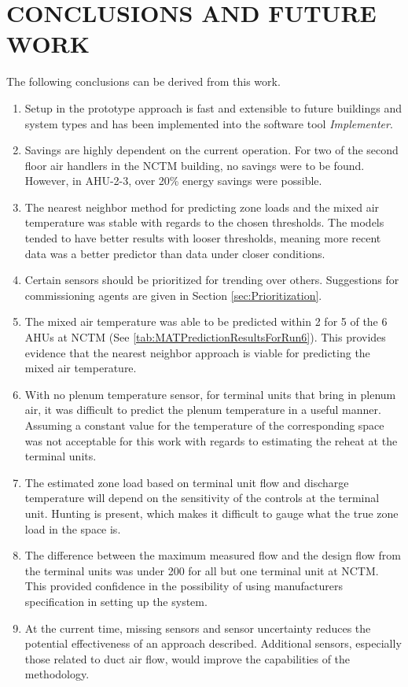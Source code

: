 \chapter{\texorpdfstring{\MakeUppercase{Conclusions and Future Work}}{Conclusions and Future Work}}

The following conclusions can be derived from this work.

\begin{enumerate}
    \item Setup in the prototype approach is fast and extensible to
        future buildings and system types and has been implemented into
        the software tool \textit{Implementer}.
    \item Savings are highly dependent on the current operation. For two
        of the second floor air handlers in the NCTM building, no
        savings were to be found. However, in AHU-2-3, over 20\% energy
        savings were possible.
    \item The nearest neighbor method for predicting zone loads and the
        mixed air temperature was stable with regards to the chosen
        thresholds. The models tended to have better results with looser
        thresholds, meaning more recent data was a better predictor than
        data under closer conditions.
    \item Certain sensors should be prioritized for trending over
        others. Suggestions for commissioning agents are given in
        Section \ref{sec:Prioritization}.
    \item The mixed air temperature was able to be predicted within
        \SI{2}{\degF} for 5 of the 6 AHUs at NCTM (See \tableref{}
        \ref{tab:MATPredictionResultsForRun6}). This provides evidence
        that the nearest neighbor approach is viable for predicting the
        mixed air temperature.
    \item With no plenum temperature sensor, for terminal units that
        bring in plenum air, it was difficult to predict the plenum
        temperature in a useful manner. Assuming a constant value for the
        temperature of the corresponding space was not acceptable for
        this work with regards to estimating the reheat at the terminal units.
    \item The estimated zone load based on terminal unit flow and
        discharge temperature will depend on the sensitivity of the
        controls at the terminal unit. Hunting is present, which makes
        it difficult to gauge what the true zone load in the space is.
    \item The difference between the maximum measured flow and the design flow
        from the terminal units was under \SI{200}{\CFM} for all but one
        terminal unit at NCTM. This provided confidence in the
        possibility of using manufacturers specification in setting up
        the system.
    \item At the current time, missing sensors and sensor uncertainty
        reduces the potential effectiveness of an approach described.
        Additional sensors, especially those related to duct air flow,
        would improve the capabilities of the methodology.
\end{enumerate}

